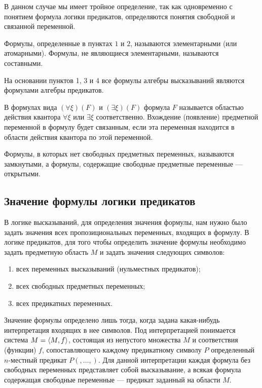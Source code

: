 \documentclass[letterpaper, 10pt]{article}
\theoremstyle{definition}
\begin{document}
	В данном случае мы имеет тройное определение, так как одновременно с
	понятием формула логики предикатов, определяются понятия свободной и
	связанной переменной.

	Формулы, определенные в пунктах $1$ и $2$, называются элементарными (или
	атомарными). Формулы, не являющиеся элементарными, называются составными.

	На основании пунктов 1, 3 и 4 все формулы алгебры высказываний являются
	формулами алгебры предикатов.
	
	В формулах вида $(\forall \xi)(F)$ и $(\exists \xi)(F)$ формула $F$
	называется областью действия квантора $\forall \xi$ или $\exists \xi$
	соответственно. Вхождение (появление) предметной переменной в формулу будет
	связанным, если эта переменная находится в области действия квантора по этой
	переменной.

	Формулы, в которых нет свободных предметных переменных, называются
	замкнутыми, а формулы, содержащие свободные предметные переменные ---
	открытыми.

	\subsection{Значение формулы логики предикатов}

	В логике высказываний, для определения значения формулы, нам нужно было
	задать значения всех пропозициональных переменных, входящих в формулу. В
	логике предикатов, для того чтобы определить значение формулы необходимо
	задать предметную область $M$ и задать значения следующих символов:
	\begin{enumerate}
		\item всех переменных высказываний (нульместных предикатов);
		\item всех свободных предметных переменных;
		\item всех предикатных переменных.
	\end{enumerate}

	Значение формулы определено лишь тогда, когда задана какая-нибудь
	интерпретация входящих в нее символов. Под интерпретацией понимается система
	$M = \left< M, f \right>$, состоящая из непустого множества $M$ и соответствия
	(функции) $f$, сопоставляющего каждому предикатному символу $P$ определенный
	$n$-местный предикат $P(,\ldots,)$. Для данной интерпретации каждая формула
	без свободных переменных представляет собой высказывание, а всякая формула
	содержащая свободные переменные --- предикат заданный на области $M$.
\end{document}
